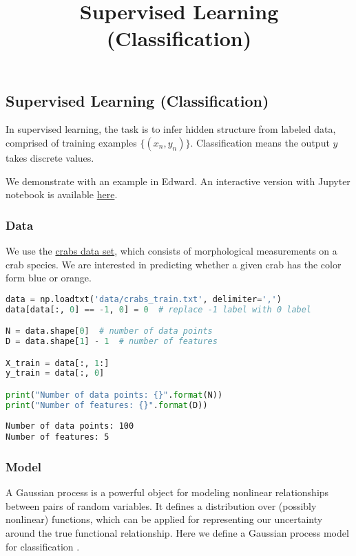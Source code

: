 \title{Supervised Learning (Classification)}

\subsection{Supervised Learning (Classification)}

In supervised learning, the task is to infer hidden structure from
labeled data, comprised of training examples $\{(x_n, y_n)\}$.
Classification means the output $y$ takes discrete values.

We demonstrate with an example in Edward.
An interactive version with Jupyter notebook is available
\href{http://nbviewer.jupyter.org/github/blei-lab/edward/blob/master/notebooks/supervised_classification.ipynb}{here}.

\subsubsection{Data}

We use the
\href{https://stat.ethz.ch/R-manual/R-devel/library/MASS/html/crabs.html}
{crabs data set},
which consists of morphological measurements on a crab species. We
are interested in predicting whether a given crab has the color form
blue or orange.
\begin{lstlisting}[language=Python]
data = np.loadtxt('data/crabs_train.txt', delimiter=',')
data[data[:, 0] == -1, 0] = 0  # replace -1 label with 0 label

N = data.shape[0]  # number of data points
D = data.shape[1] - 1  # number of features

X_train = data[:, 1:]
y_train = data[:, 0]

print("Number of data points: {}".format(N))
print("Number of features: {}".format(D))
\end{lstlisting}

\begin{lstlisting}
Number of data points: 100
Number of features: 5
\end{lstlisting}

\subsubsection{Model}

A Gaussian process is a powerful object for modeling nonlinear
relationships between pairs of random variables. It defines a distribution over
(possibly nonlinear) functions, which can be applied for representing
our uncertainty around the true functional relationship.
Here we define a Gaussian process model for classification
\citep{rasmussen2006gaussian}.

